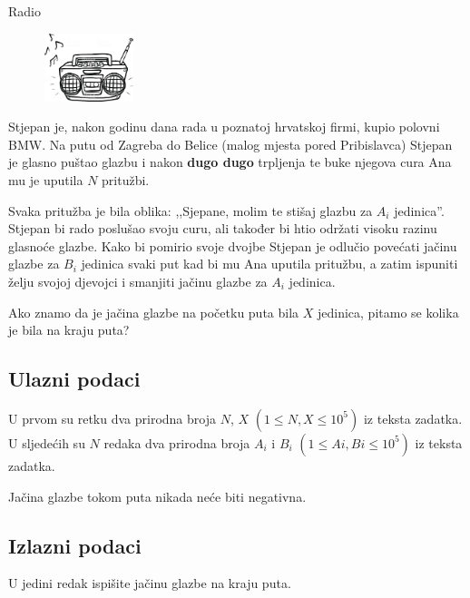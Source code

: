 \begin{statement}[
  problempoints=30,
  timelimit=1 sekunda,
  memorylimit=512 MiB,
]{Radio}

\setlength\intextsep{-0.1cm}
\begin{figure}
\centering
\includegraphics[width=0.23\textwidth]{img/radio.jpg}
\end{figure}

Stjepan je, nakon godinu dana rada u poznatoj hrvatskoj firmi, kupio polovni
BMW. Na putu od Zagreba do Belice (malog mjesta pored Pribislavca) Stjepan je
glasno puštao glazbu i nakon \textbf{dugo dugo} trpljenja te buke njegova
cura Ana mu je uputila $N$ pritužbi.

Svaka pritužba je bila oblika:
,,Sjepane, molim te stišaj glazbu za $A_i$ jedinica''.  Stjepan bi rado
poslušao svoju curu, ali također bi htio održati visoku razinu glasnoće
glazbe. Kako bi pomirio svoje dvojbe Stjepan je odlučio povećati jačinu
glazbe za $B_i$ jedinica svaki put kad bi mu Ana uputila pritužbu, a zatim
ispuniti želju svojoj djevojci i smanjiti jačinu glazbe za $A_i$ jedinica.

Ako znamo da je jačina glazbe na početku puta bila $X$ jedinica, pitamo se
kolika je bila na kraju puta?

\subsection*{Ulazni podaci}
U prvom su retku dva prirodna broja $N$, $X$ $(1 \le N, X \le 10^5)$ iz teksta
zadatka. \\
U sljedećih su $N$ redaka dva prirodna broja $A_i$ i $B_i$ $(1 \le Ai, Bi \le 10^5)$
iz teksta zadatka.

Jačina glazbe tokom puta nikada neće biti negativna.

\subsection*{Izlazni podaci}
U jedini redak ispišite jačinu glazbe na kraju puta.


\end{statement}
